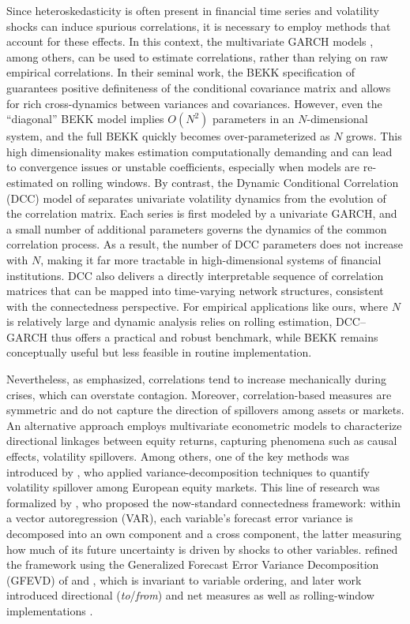 Since heteroskedasticity is often present in financial time series and volatility shocks can induce spurious correlations, it is necessary to employ methods that account for these effects. In this context, the multivariate GARCH models \citep{EngleKroner1995, Engle2002DCC, Cappiello_DCC_2006}, among others, can be used to estimate correlations, rather than relying on raw empirical correlations.  In their seminal work, the BEKK
specification of \citet{EngleKroner1995} guarantees positive definiteness of the
conditional covariance matrix and allows for rich cross-dynamics between variances and
covariances. However, even the ``diagonal'' BEKK model implies $O(N^2)$ parameters in
an $N$-dimensional system, and the full BEKK quickly becomes over-parameterized as $N$
grows. This high dimensionality makes estimation computationally demanding and can lead
to convergence issues or unstable coefficients, especially when models are re-estimated
on rolling windows.
By contrast, the Dynamic Conditional Correlation (DCC) model of \citet{Engle2002DCC}
separates univariate volatility dynamics from the evolution of the correlation matrix.
Each series is first modeled by a univariate GARCH, and a small number of additional
parameters governs the dynamics of the common correlation process. As a result, the
number of DCC parameters does not increase with $N$, making it far more tractable in
high-dimensional systems of financial institutions. DCC also delivers a directly
interpretable sequence of correlation matrices that can be mapped into time-varying
network structures, consistent with the connectedness perspective. For empirical
applications like ours, where $N$ is relatively large and dynamic analysis relies on
rolling estimation, DCC--GARCH thus offers a practical and robust benchmark, while BEKK
remains conceptually useful but less feasible in routine implementation.

Nevertheless,
as \citet{ForbesRigobon2002} emphasized, correlations
tend to increase mechanically during crises, which can overstate contagion. Moreover, correlation-based measures are symmetric and do not capture the direction of spillovers among assets or  markets. An alternative approach employs multivariate econometric models to characterize directional linkages between equity returns, capturing phenomena such as causal effects, volatility spillovers.
Among others, one of the key methods was introduced by \citet{Yilmaz2006}, who applied
variance-decomposition techniques to quantify volatility spillover among European equity
markets. This line of research was formalized by \citet{DieboldYilmaz2009}, who proposed
the now-standard connectedness framework: within a vector autoregression (VAR), each
variable's forecast error variance is decomposed into an own component and a cross
component, the latter measuring how much of its future uncertainty is driven by shocks to
other variables. \citet{DieboldYilmaz2012} refined the framework using the Generalized
Forecast Error Variance Decomposition (GFEVD) of \citet{KoopPesaranShin1996} and
\citet{PesaranShin1998}, which is invariant to variable ordering, and later work
introduced directional (\emph{to}/\emph{from}) and net measures as well as
rolling-window implementations \citep{DieboldYilmaz2014,DieboldYilmaz2015}.


